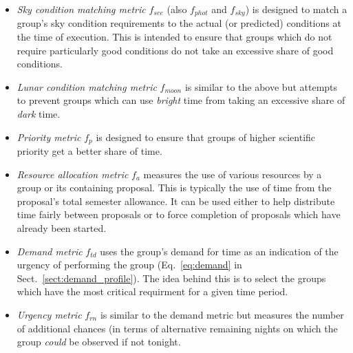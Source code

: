 \begin{itemize}
\item \emph{Sky condition matching metric} $f_{see}$ (also $f_{phot}$ and $f_{sky}$) is designed to match a group's sky condition requirements to the actual (or predicted) conditions at the time of execution. This is intended to ensure that groups which do not require particularly good conditions do not take an excessive share of good conditions.  

\item \emph{Lunar condition matching metric} $f_{moon}$ is similar to the above but attempts to prevent groups which can use \emph{bright} time from taking an excessive share of \emph{dark} time.

\item\emph{Priority metric} $f_p$ is designed to ensure that groups of higher scientific priority get a better share of time. 

\item \emph{Resource allocation metric} $f_{a}$ measures the use of various resources by a group or its containing proposal. This is typically the use of time from the proposal's total semester allowance. It can be used either to help distribute time fairly between proposals or to force completion of proposals which have already been started.

\item \emph{Demand metric} $f_{td}$ uses the group's demand for time as an indication of the urgency of performing the group (Eq.~\ref{eq:demand} in Sect.~\ref{sect:demand_profile}). The idea behind this is to select the groups which have the most critical requirment for a given time period. 

\item \emph{Urgency metric} $f_{rn}$ is similar to the demand metric but measures the number of additional chances (in terms of alternative remaining nights on which the group \emph{could} be observed if not tonight.


\end{itemize}
